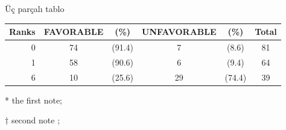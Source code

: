 \pagebreak
\begin{mycode}
 \begin{center}
\begin{threeparttable}
	\renewcommand{\arraystretch}{1.3}
	\caption{Üç parçalı tablo}
	\label{tablo:UP} %
       \begin{tabular}{rccccc}
        	\hline\hline
        	Ranks & FAVORABLE \tnote{*} &(\%) & UNFAVORABLE &(\%) & Total \\ \hline
        	0 & 74 & (91.4) & 7 & (8.6) & 81 \\ 
        	1 & 58 & (90.6) & 6 & (9.4) & 64 \\ 
        	6 & 10 & (25.6) & 29 & (74.4) & 39 \\\hline
       \end{tabular}
	\begin{tablenotes}
		\footnotesize
		\item[*] the first note; %
		\item[$\dag$] second note ; %
	\end{tablenotes}
\end{threeparttable}
 \end{center}
\end{mycode}


